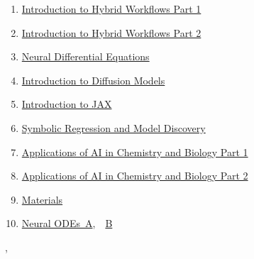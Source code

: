 \documentclass[11pt]{article}
\renewcommand{\today}{\shortmonthname[\the\month] \the \day,  \the\year}
\begin{document}
\begin{enumerate}
	\item  \href{https://mp.weixin.qq.com/s/jzBGgd9XeqOVTx5I8j34QQ}{Introduction to Hybrid Workflows Part 1}%
	\item  \href{https://mp.weixin.qq.com/s/VxdD9EywtsPI632EvBlsEw}{Introduction to Hybrid Workflows Part 2}%
	\item  \href{https://mp.weixin.qq.com/s/aCbgnQ-1bqhl9v2Adt-UQw}{Neural Differential Equations}%
	\item  \href{https://mp.weixin.qq.com/s/39QWfQbx9lCO9uCvfyE86g}{Introduction to Diffusion Models}%
	\item  \href{https://mp.weixin.qq.com/s/sdj-TSYYHWfTL6HvoneTzQ}{ Introduction to JAX}%
	\item  \href{https://mp.weixin.qq.com/s/WuNYxKklDRxUC8uTcfdcqQ}{Symbolic Regression and Model Discovery}%
	\item  \href{https://mp.weixin.qq.com/s/6NSmRsGTt4_mG1ISQ96JQg}{Applications of AI in Chemistry and Biology Part 1}%
	\item  \href{https://mp.weixin.qq.com/s/qUnkdShAVOhd-44Dc0GIQA}{Applications of AI in Chemistry and Biology Part 2}%
	\item \href{https://pan.baidu.com/s/1GwylrUaNxOWzrqXclnSiQg?pwd=1121}{Materials}
	\item  \href{https://mp.weixin.qq.com/s/ohloykJvnypR8mv20LJ6ZQ}{Neural ODEs\ A},\ \  \href{https://mp.weixin.qq.com/s/nmwFGJy3p5XqOkcjCjlzwQ}{B}
\end{enumerate}



%
\begin{flushright}
	\tiny \today 
\end{flushright}
\end{document}

